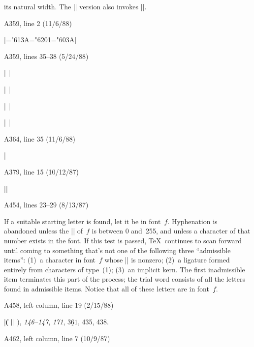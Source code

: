\ninepoint\noindent
its natural width. The |\hbox| version also invokes |\everymath|.

\bugonpage A359, line 2 (11/6/88)

\ninepoint\noindent
|\mathchardef\ldotp="613A\mathchardef\cdotp="6201\mathchardef\colon="603A|

\bugonpage A359, lines 35--38 (5/24/88)

\ninepoint\noindent
|\def\updownarrow{\delimiter"326C33F } \def\arrowvert{\delimiter"033C000 }|%
 \par\noindent
|\def\Updownarrow{\delimiter"326D377 } \def\Arrowvert{\delimiter"033D000 }  |%
 \par\noindent
|\def\vert{\delimiter"026A30C }        \def\Vert{\delimiter"026B30D }     |%
 \par\noindent
|\def\backslash{\delimiter"026E30F }   \def\bracevert{\delimiter"033E000 }|

\bugonpage A364, line 35 (11/6/88)

\ninepoint\noindent
|\def\fmtname{plain}\def\fmtversion{2.94} %

\bugonpage A379, line 15 (10/12/87)

\ninepoint
|\def\deleterightmost#1{\edef#1{\expandafter\xyzzy#1\xyzzy}}|

\bugonpage A454, lines 23--29 (8/13/87)

\begingroup
{}  
 
\ddanger If a suitable starting letter is found, let it be in font~$f$.
Hyphenation is abandoned unless the |\hyphenchar| of~$f$ is between
0 and~255, and unless a character of that number exists in the font.
If this test is passed, \TeX\ continues to scan forward
until coming to something that's not one of the following three
``admissible items'': (1)~a character in font~$f$ whose |\lccode|
is nonzero; (2)~a ligature formed entirely from characters of type~(1);
(3)~an implicit kern. The first inadmissible item terminates this part of
the process; the trial word consists of all the letters found in admissible
items. Notice that all of these letters are in font~$f$.

\endgroup %

\bugonpage A458, left column, line 19 (2/15/88)

\eightpoint\indent
|\|\| ( $\Vert$ ), {\it146--147}, {\it171}, $\underline{361}$, 435, 438.

\bugonpage A462, left column, line 7 (10/9/87)

